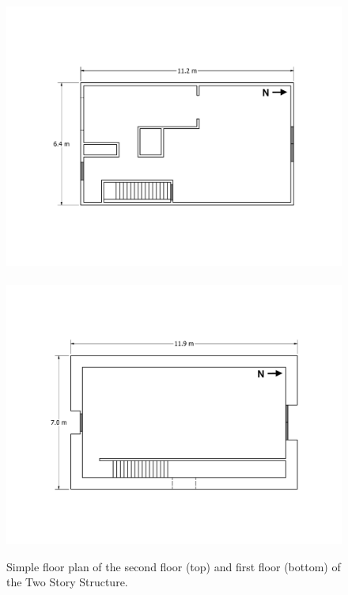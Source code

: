 \documentclass[12pt,oneside]{book}
\begin{document}
\begin{figure}[!ht]
	\includegraphics[width=.985\columnwidth]{../Figures/Floor_Plans/West_Test_Structure_2nd_Floor_Dimensioned_LxW}
	\\~\\
	\includegraphics[width=\columnwidth]{../Figures/Floor_Plans/West_Test_Structure_1st_Floor_Dimensioned_LxW}
	\caption[Simple floor plan of the first and second floors of the Two Story Structure.]{Simple floor plan of the second floor (top) and first floor (bottom) of the Two Story Structure.}
	\label{fig:simple_west_dimensioned_plan}
\end{figure}

\clearpage
\end{document}
